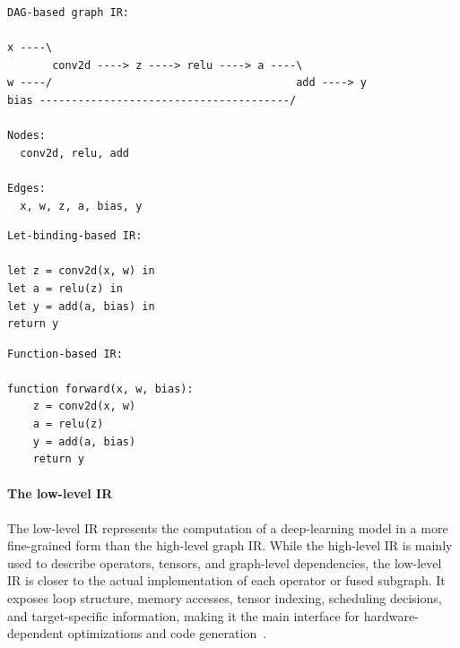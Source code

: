 \documentclass[12pt,a4paper]{report}
\begin{document}
\begin{listing}[htbp]
\begin{verbatim}
DAG-based graph IR:

x ----\
       conv2d ----> z ----> relu ----> a ----\
w ----/                                      add ----> y
bias ---------------------------------------/

Nodes:
  conv2d, relu, add

Edges:
  x, w, z, a, bias, y
\end{verbatim}
\caption{Example of a DAG-based graph IR representation.}
\label{lst:dag_graph_ir}
\end{listing}

\begin{listing}[htbp]
\begin{verbatim}
Let-binding-based IR:

let z = conv2d(x, w) in
let a = relu(z) in
let y = add(a, bias) in
return y
\end{verbatim}
\caption{Example of a let-binding-based IR representation.}
\label{lst:let_binding_ir}
\end{listing}

\begin{listing}[htbp]
\begin{verbatim}
Function-based IR:

function forward(x, w, bias):
    z = conv2d(x, w)
    a = relu(z)
    y = add(a, bias)
    return y
\end{verbatim}
\caption{Example of a function-based IR representation.}
\label{lst:function_based_ir}
\end{listing}


\paragraph{The low-level IR}
The low-level IR represents the computation of a deep-learning model in a more fine-grained form
than the high-level graph IR. While the high-level IR is mainly used to describe operators, tensors,
and graph-level dependencies, the low-level IR is closer to the actual implementation of each
operator or fused subgraph. It exposes loop structure, memory accesses, tensor indexing,
scheduling decisions, and target-specific information, making it the main interface for
hardware-dependent optimizations and code generation~\cite{li2020deep}.
\end{document}
